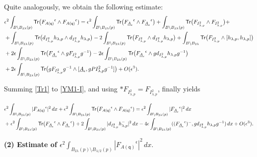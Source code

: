 \documentclass[11pt]{article}
\numberwithin{equation}{section} \setlength{\topmargin}{-35pt}
\newcommand{\q}{\mathsf{q}}
\newcommand{\tr}{\mathsf{Tr}}
\begin{document}
\noindent Quite analogously, we obtain the following estimate:
\begin{align}
\label{Tr1} &\epsilon^2\int _{B\setminus
B_{2\lambda}(p)}\tr\bigl({F_{A(\q)}}^{\epsilon}\wedge
{F_{A(\q)}}^{\epsilon})= \epsilon^2\int _{B\setminus
B_{2\lambda}(p)}\tr\bigl({F_{\underline
A_\epsilon}}^{\epsilon}\wedge {F_{\underline
A_\epsilon}}^{\epsilon}\bigr)+\int _{B\setminus
B_{2\lambda}(p)}\tr\bigl(F_{I^2_{\lambda,p}}\wedge
F_{I^2_{\lambda,p}}\bigr)+\notag\\
&+\int_{B\setminus
B_{2\lambda}(p)}\tr\bigl(d_{I^2_{\lambda,p}}h_{\lambda,p}\wedge
d_{I^2_{\lambda,p}}h_{\lambda,p}\bigr)-2 \int_{B\setminus
B_{2\lambda}(p)}\tr\bigl(F_{I^2_{\lambda,p}}\wedge
d_{I^2_{\lambda,p}}h_{\lambda,p}\bigr)+\int_{B\setminus
B_{2\lambda}}\tr\bigl(F_{I^2_{\lambda,p}}\wedge [h_{\lambda,p},h_{\lambda,p}]\bigr)\notag\\
&+2\epsilon\int_{B\setminus B_{2\lambda}(p)}\tr\bigl({F_{\underline
A_\epsilon}}^{\epsilon}\wedge
gF_{I^2_{\lambda,p}}g^{-1}\bigr)-2\epsilon\int_{B\setminus
B_{2\lambda}(p)}\tr\bigl({F_{\underline
A_\epsilon}}^{\epsilon}\wedge
gd_{I^2_{\lambda,p}}h_{\lambda,p}g^{-1}\bigr)\notag\\
& +2\epsilon\int_{B\setminus
B_{2\lambda}(p)}\tr\bigl(gF_{I^2_{\lambda,p}}g^{-1}\wedge[\underline
A_\epsilon,gPI^2_{\lambda,p}g^{-1}]\bigr)+O(\epsilon^3).
\end{align}

\noindent Summing \eqref{Tr1} to  \eqref{YM1-I}, and using
$*F_{I^2_{\lambda,p}}= F_{I^2_{\lambda,p}}$, finally yields

\begin{align}
\label{D1} &\epsilon^2\int_{B\setminus
B_{2\lambda}(p)}|{F_{A(\q)}}^{\epsilon}|^2\,dx+\epsilon^2\int
_{B\setminus B_{2\lambda}(p)}\tr\bigl({F_{A(\q)}}^{\epsilon}\wedge
{F_{A(\q)}}^{\epsilon})= \epsilon^2\int_{B\setminus
B_{2\lambda}(p)}|{F_{\underline{A}_{\epsilon}}}^{\epsilon}|^2\,dx\notag\\
&+\epsilon^2\int _{B\setminus
B_{2\lambda}(p)}\tr\bigl({F_{\underline
A_\epsilon}}^{\epsilon}\wedge {F_{\underline
A_\epsilon}}^{\epsilon}\bigr)+2\int_{B\setminus
B_{2\lambda}(p)}|d_{I^2_{\lambda,p}}h_{\lambda,p}^-|^2\,dx
-4\epsilon\int_{B\setminus B_{2\lambda}(p)}(({F_{\underline
A_\epsilon}}^{\epsilon})^-,gd_{I^2_{\lambda,p}}h_{\lambda,p}g^{-1})\,dx
+O(\epsilon^3).
\end{align}


\medskip

\noindent \textbf{(2) Estimate of
$\epsilon^2\int_{B_{2\lambda}(p)\setminus
B_{\lambda/2}(p)}|{F_{A(\q)}}^{\epsilon}|^2\,dx$}\;.
\end{document}
